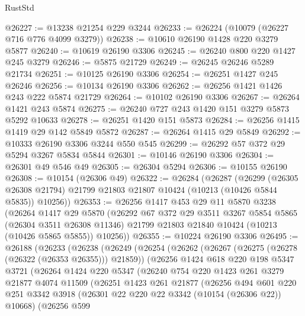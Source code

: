 \begin{lexlean}{RustStd}
\begin{coremodule}
@26227 := @13238 @21254 @229 @3244
@26233 := @26224 (@10079 (@26227 @716 @776 @4099 @3279))
@26238 := @10610 @26190 @1428 @220 @3279 @5877
@26240 := @10619 @26190 @3306
@26245 := @26240 @800 @220 @1427 @245 @3279
@26246 := @5875 @21729
@26249 := @26245 @26246 @5289 @21734
@26251 := @10125 @26190 @3306
@26254 := @26251 @1427 @245 @26246
@26256 := @10134 @26190 @3306
@26262 := @26256 @1421 @1426 @243 @222 @5874 @21729
@26264 := @10102 @26190 @3306
@26267 := @26264 @1421 @243 @5874
@26275 := @26240 @727 @243 @1420 @151 @3279 @5873 @5292 @10633
@26278 := @26251 @1420 @151 @5873
@26284 := @26256 @1415 @1419 @29 @142 @5849 @5872
@26287 := @26264 @1415 @29 @5849
@26292 := @10333 @26190 @3306 @3244 @550 @545
@26299 := @26292 @57 @372 @29 @5294 @3267 @5834 @5844
@26301 := @10146 @26190 @3306
@26304 := @26301 @49 @546 @49
@26305 := @26304 @5294
@26306 := @10155 @26190
@26308 := @10154 (@26306 @49)
@26322 := @26284
    (@26287
      (@26299
        (@26305 @26308 @21794)
        @21799
        @21803
        @21807
        @10424
        (@10213 (@10426 @5844 @5835))
        @10256))
@26353 := @26256
    @1417
    @453
    @29
    @11
    @5870
    @3238
    (@26264
      @1417
      @29
      @5870
      (@26292
        @67
        @372
        @29
        @3511
        @3267
        @5854
        @5865
        (@26304 @3511 @26308 @11346)
        @21799
        @21803
        @21840
        @10424
        (@10213 (@10426 @5865 @5855))
        @10256))
@26355 := @10224 @26190 @3306
@26495 := @26188
    (@26233
      (@26238
        (@26249
          (@26254
            (@26262
              (@26267 (@26275 (@26278 (@26322 (@26353 @26355))) @21859))
              (@26256
                @1424
                @618
                @220
                @198
                @5347
                @3721
                (@26264
                  @1424
                  @220
                  @5347
                  (@26240
                    @754
                    @220
                    @1423
                    @261
                    @3279
                    @21877
                    @4074
                    @11509
                    (@26251
                      @1423
                      @261
                      @21877
                      (@26256
                        @494
                        @601
                        @220
                        @251
                        @3342
                        @3918
                        (@26301 @22 @220 @22 @3342 (@10154 (@26306 @22)) @10668)
                        (@26256
                          @599

\end{coremodule}
\end{lexlean}
